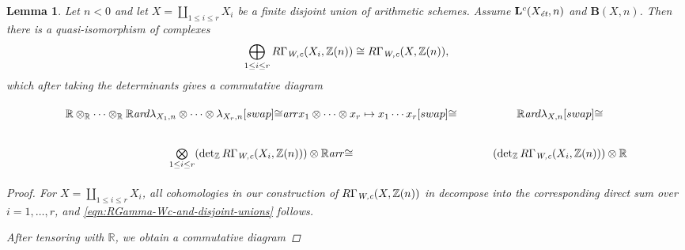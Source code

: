 \documentclass[10pt,a4paper,oneside]{article}
\newcommand{\RR}{\mathbb{R}}
\newcommand{\ZZ}{\mathbb{Z}}
\renewcommand{\det}{\operatorname{det}}
\newcommand{\ar}{\text{\it ar}}
\newcommand{\et}{\text{\it \'{e}t}}
\newcommand{\Wc}{\text{\it W,c}}
\theoremstyle{myplain}
\newtheorem{lemma}[theorem]{Lemma}
\theoremstyle{mydefinition}
\numberwithin{equation}{section}
\begin{document}
\begin{lemma}
  \label{lemma:lambda-and-disjoint-unions}
  Let $n < 0$ and let $X = \coprod_{1 \le i \le r} X_i$ be a finite disjoint
  union of arithmetic schemes. Assume $\mathbf{L}^c (X_\et,n)$ and
  $\mathbf{B} (X,n)$. Then there is a quasi-isomorphism of complexes
  \begin{equation}
    \label{eqn:RGamma-Wc-and-disjoint-unions}
    \bigoplus_{1 \le i \le r} R\Gamma_\Wc (X_i, \ZZ(n)) \cong
    R\Gamma_\Wc (X, \ZZ(n)),
  \end{equation}
  which after taking the determinants gives a commutative diagram

  \begin{equation}
    \label{eqn:lambda-and-disjoint-unions}
    \begin{tikzcd}
      \RR \otimes_\RR \cdots \otimes_\RR \RR\ar{d}{\lambda_{X_1,n}\otimes\cdots\otimes\lambda_{X_r,n}}[swap]{\cong} \ar{r}{x_1\otimes\cdots\otimes x_r \mapsto x_1\cdots x_r}[swap]{\cong} & \RR \ar{d}{\lambda_{X,n}}[swap]{\cong} \\
      \bigotimes\limits_{1 \le i \le r} (\det_\ZZ R\Gamma_\Wc (X_i, \ZZ(n))) \otimes \RR \ar{r}{\cong} & (\det_\ZZ R\Gamma_\Wc (X_i, \ZZ(n))) \otimes \RR
    \end{tikzcd}
  \end{equation}

  \begin{proof}
    For $X = \coprod_{1 \le i \le r} X_i$, all cohomologies in our construction
    of $R\Gamma_\Wc (X, \ZZ(n))$ in \cite{Beshenov-Weil-etale-1} decompose into
    the corresponding direct sum over $i = 1,\ldots,r$, and
    \eqref{eqn:RGamma-Wc-and-disjoint-unions} follows.

    After tensoring with $\RR$, we obtain a commutative diagram


\end{proof}
\end{lemma}
\end{document}
